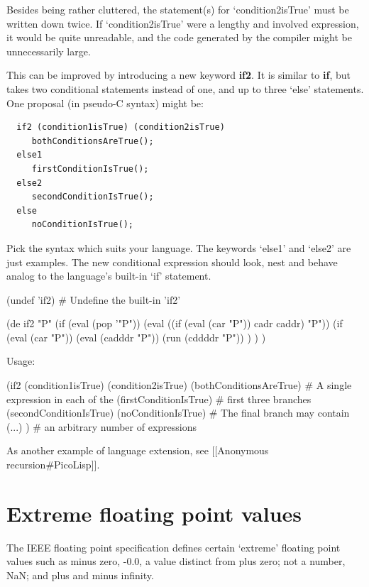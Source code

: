 Besides being rather cluttered, the statement(s) for `condition2isTrue'
must be written down twice. If `condition2isTrue' were a lengthy and
involved expression, it would be quite unreadable, and the code
generated by the compiler might be unnecessarily large.

This can be improved by introducing a new keyword \textbf{if2}. It is
similar to \textbf{if}, but takes two conditional statements instead of
one, and up to three `else' statements. One proposal (in pseudo-C
syntax) might be:

\begin{verbatim}
  if2 (condition1isTrue) (condition2isTrue)
     bothConditionsAreTrue();
  else1
     firstConditionIsTrue();
  else2
     secondConditionIsTrue();
  else
     noConditionIsTrue();
\end{verbatim}

Pick the syntax which suits your language. The keywords `else1' and
`else2' are just examples. The new conditional expression should look,
nest and behave analog to the language's built-in `if' statement.


\begin{wideverbatim}

(undef 'if2)  # Undefine the built-in 'if2'

(de if2 "P"
   (if (eval (pop '"P"))
      (eval ((if (eval (car "P")) cadr caddr) "P"))
      (if (eval (car "P"))
         (eval (cadddr "P"))
         (run (cddddr "P")) ) ) )

Usage:

(if2 (condition1isTrue) (condition2isTrue)
   (bothConditionsAreTrue)             # A single expression in each of the
   (firstConditionIsTrue)              # first three branches
   (secondConditionIsTrue)
   (noConditionIsTrue)                 # The final branch may contain
   (...) )                             # an arbitrary number of expressions

As another example of language extension, see [[Anonymous recursion#PicoLisp]].

\end{wideverbatim}

\pagebreak{}
\section*{Extreme floating point values}

The IEEE floating point specification defines certain `extreme' floating
point values such as minus zero, -0.0, a value distinct from plus zero;
not a number, NaN; and plus and minus infinity.

